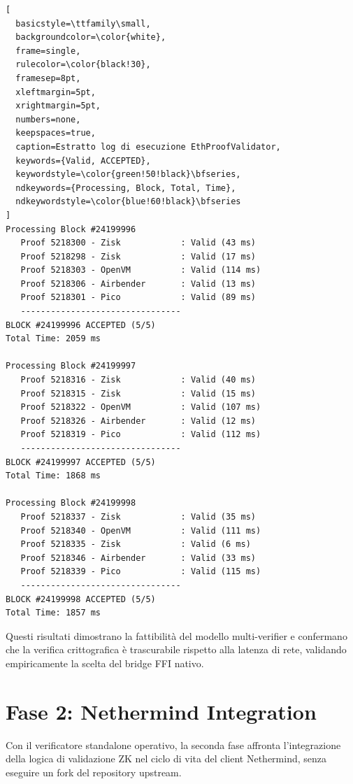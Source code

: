 \documentclass[12pt,a4paper,openright,twoside]{report}
\begin{document}
\begin{minipage}{\textwidth}
\begin{lstlisting}[
  basicstyle=\ttfamily\small,
  backgroundcolor=\color{white},
  frame=single,
  rulecolor=\color{black!30},
  framesep=8pt,
  xleftmargin=5pt,
  xrightmargin=5pt,
  numbers=none,
  keepspaces=true,
  caption=Estratto log di esecuzione EthProofValidator,
  keywords={Valid, ACCEPTED},
  keywordstyle=\color{green!50!black}\bfseries,
  ndkeywords={Processing, Block, Total, Time},
  ndkeywordstyle=\color{blue!60!black}\bfseries
]
Processing Block #24199996
   Proof 5218300 - Zisk            : Valid (43 ms)
   Proof 5218298 - Zisk            : Valid (17 ms)
   Proof 5218303 - OpenVM          : Valid (114 ms)
   Proof 5218306 - Airbender       : Valid (13 ms)
   Proof 5218301 - Pico            : Valid (89 ms)
   --------------------------------
BLOCK #24199996 ACCEPTED (5/5)
Total Time: 2059 ms

Processing Block #24199997
   Proof 5218316 - Zisk            : Valid (40 ms)
   Proof 5218315 - Zisk            : Valid (15 ms)
   Proof 5218322 - OpenVM          : Valid (107 ms)
   Proof 5218326 - Airbender       : Valid (12 ms)
   Proof 5218319 - Pico            : Valid (112 ms)
   --------------------------------
BLOCK #24199997 ACCEPTED (5/5)
Total Time: 1868 ms

Processing Block #24199998
   Proof 5218337 - Zisk            : Valid (35 ms)
   Proof 5218340 - OpenVM          : Valid (111 ms)
   Proof 5218335 - Zisk            : Valid (6 ms)
   Proof 5218346 - Airbender       : Valid (33 ms)
   Proof 5218339 - Pico            : Valid (115 ms)
   --------------------------------
BLOCK #24199998 ACCEPTED (5/5)
Total Time: 1857 ms
\end{lstlisting}
\end{minipage}

Questi risultati dimostrano la fattibilità del modello multi-verifier e confermano che la verifica crittografica è trascurabile rispetto alla latenza di rete, validando empiricamente la scelta del bridge FFI nativo.

\section{Fase 2: Nethermind Integration}\label{sec:integration}

Con il verificatore standalone operativo, la seconda fase affronta l'integrazione della logica di validazione ZK nel ciclo di vita del client Nethermind, senza eseguire un fork del repository upstream.
\end{document}

